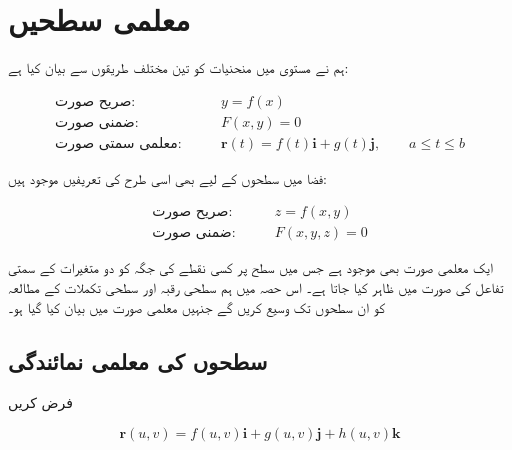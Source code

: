 \section{معلمی سطحیں}

ہم نے مستوی میں منحنیات کو تین مختلف طریقوں سے بیان کیا ہے:

\begin{align*}
\text{صریح صورت:}\qquad & y=f(x) \\
\text{ضمنی صورت:}\qquad & F(x,y)=0 \\
\text{معلمی سمتی صورت:}\qquad & \mathbf{r}(t)=f(t)\mathbf{i}+g(t)\mathbf{j},
\qquad a\le t\le b
\end{align*}

فضا میں سطحوں کے لیے بھی اسی طرح کی تعریفیں موجود ہیں:

\begin{align*}
\text{صریح صورت:}\qquad & z=f(x,y) \\
\text{ضمنی صورت:}\qquad & F(x,y,z)=0
\end{align*}

ایک معلمی صورت بھی موجود ہے جس میں سطح پر کسی نقطے کی جگہ کو دو متغیرات کے سمتی تفاعل کی صورت میں ظاہر کیا جاتا ہے۔ اس حصہ میں ہم سطحی رقبہ اور سطحی تکملات کے مطالعہ کو ان سطحوں تک وسیع کریں گے جنہیں معلمی صورت میں بیان کیا گیا ہو۔

\subsection*{سطحوں کی معلمی نمائندگی}

فرض کریں

\begin{equation}
\mathbf{r}(u,v)
=
f(u,v)\mathbf{i}
+
g(u,v)\mathbf{j}
+
h(u,v)\mathbf{k}
\label{eq:16.6.1}
\end{equation}

